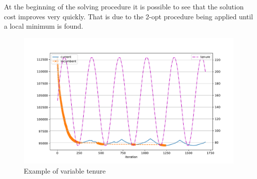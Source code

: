 \documentclass{article}
\begin{document}
At the beginning of the solving procedure it is possible to see that the solution
cost improves very quickly. That is due to the 2-opt procedure being applied
until a local minimum is found.

\begin{figure}[ht]
        \caption{Example of variable tenure}
        \label{fig:sin_ten}
        \centering
        \includegraphics[width=400pt]{assets/sin_ten.pdf}
\end{figure}

\clearpage
\end{document}
